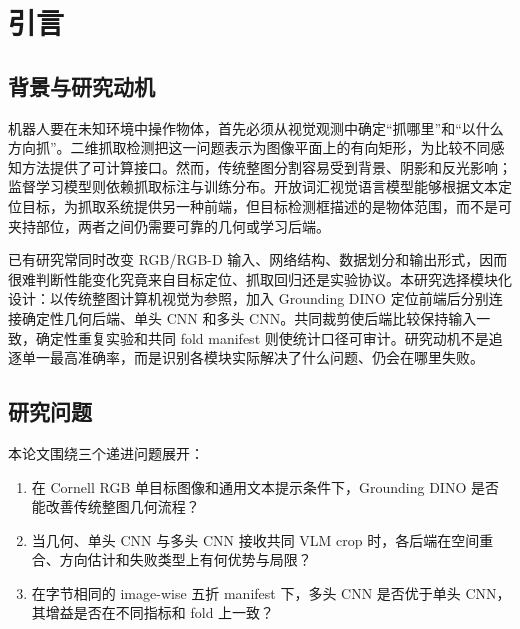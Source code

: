 \documentclass{l4proj}
\begin{document}
\educationalconsent

\tableofcontents

\chapter{引言}

\section{背景与研究动机}
机器人要在未知环境中操作物体，首先必须从视觉观测中确定“抓哪里”和“以什么方向抓”。二维抓取检测把这一问题表示为图像平面上的有向矩形，为比较不同感知方法提供了可计算接口。然而，传统整图分割容易受到背景、阴影和反光影响；监督学习模型则依赖抓取标注与训练分布。开放词汇视觉语言模型能够根据文本定位目标，为抓取系统提供另一种前端，但目标检测框描述的是物体范围，而不是可夹持部位，两者之间仍需要可靠的几何或学习后端。

已有研究常同时改变 RGB/RGB-D 输入、网络结构、数据划分和输出形式，因而很难判断性能变化究竟来自目标定位、抓取回归还是实验协议。本研究选择模块化设计：以传统整图计算机视觉为参照，加入 Grounding DINO 定位前端后分别连接确定性几何后端、单头 CNN 和多头 CNN。共同裁剪使后端比较保持输入一致，确定性重复实验和共同 fold manifest 则使统计口径可审计。研究动机不是追逐单一最高准确率，而是识别各模块实际解决了什么问题、仍会在哪里失败。

\section{研究问题}
本论文围绕三个递进问题展开：

\begin{enumerate}
    \item 在 Cornell RGB 单目标图像和通用文本提示条件下，Grounding DINO 是否能改善传统整图几何流程？
    \item 当几何、单头 CNN 与多头 CNN 接收共同 VLM crop 时，各后端在空间重合、方向估计和失败类型上有何优势与局限？
    \item 在字节相同的 image-wise 五折 manifest 下，多头 CNN 是否优于单头 CNN，其增益是否在不同指标和 fold 上一致？
\end{enumerate}
\end{document}
